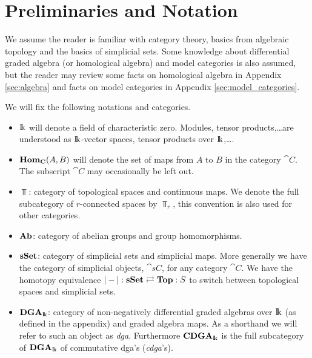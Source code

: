 \section{Preliminaries and Notation}

We assume the reader is familiar with category theory, basics from algebraic topology and the basics of simplicial sets. Some knowledge about differential graded algebra (or homological algebra) and model categories is also assumed, but the reader may review some facts on homological algebra in Appendix \ref{sec:algebra} and facts on model categories in Appendix \ref{sec:model_categories}.

We will fix the following notations and categories.
\begin{itemize}
	\item $\mathrm{I\!k}$ will denote a field of characteristic zero. Modules, tensor products,\dots are understood as $\mathrm{I\!k}$-vector spaces, tensor products over $\mathrm{I\!k}$,\dots.
	\item $\mathbf{Hom}_{\mathbf{C}}(A, B)$ will denote the set of maps from $A$ to $B$ in the category $\cat{C}$. The subscript $\cat{C}$ may occasionally be left out.
	\item $\Top$: category of topological spaces and continuous maps. We denote the full subcategory of $r$-connected spaces by $\Top_r$, this convention is also used for other categories.
	\item $\mathbf{Ab}$: category of abelian groups and group homomorphisms.
	\item $\mathbf{s{\mathbf{Set}}}$: category of simplicial sets and simplicial maps. More generally we have the category of simplicial objects, $\cat{sC}$, for any category $\cat{C}$. We have the homotopy equivalence $|-| : \mathbf{s{\mathbf{Set}}} \rightleftarrows \mathbf{Top} : S$ to switch between topological spaces and simplicial sets.
	\item $\mathbf{DGA}_{\mathrm{I\!k}}$: category of non-negatively differential graded algebras over $\mathrm{I\!k}$ (as defined in the appendix) and graded algebra  maps. As a shorthand we will refer to such an object as \emph{dga}. Furthermore $\mathbf{CDGA}_{\mathrm{I\!k}}$ is the full subcategory of $\mathbf{DGA}_{\mathrm{I\!k}}$ of commutative dga's (\emph{cdga}'s).
\end{itemize}

\tableofcontents
{}
